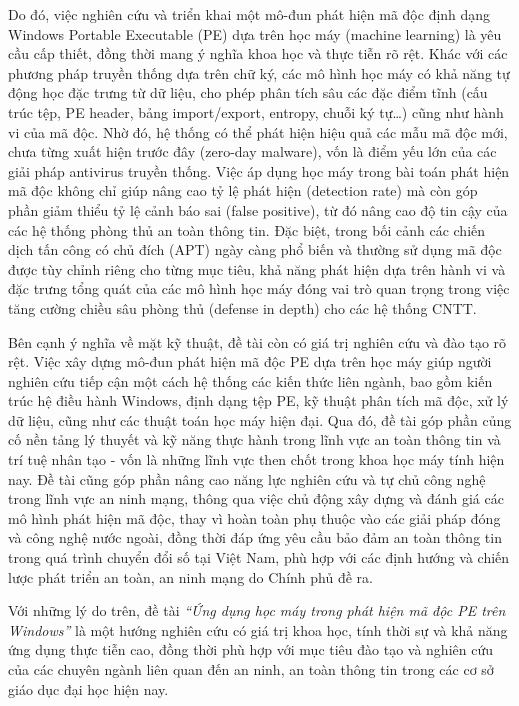 Do đó, việc nghiên cứu và triển khai một mô-đun phát hiện mã độc định dạng
Windows Portable Executable (PE) dựa trên học máy (machine learning) là yêu
cầu cấp thiết, đồng thời mang ý nghĩa khoa học và thực tiễn rõ rệt. Khác với
các phương pháp truyền thống dựa trên chữ ký, các mô hình học máy có khả năng
tự động học đặc trưng từ dữ liệu, cho phép phân tích sâu các đặc điểm tĩnh
(cấu trúc tệp, PE header, bảng import/export, entropy, chuỗi ký tự\ldots) cũng
như hành vi của mã độc. Nhờ đó, hệ thống có thể phát hiện hiệu quả các mẫu
mã độc mới, chưa từng xuất hiện trước đây (zero-day malware), vốn là điểm yếu
lớn của các giải pháp antivirus truyền thống. Việc áp dụng học máy trong bài
toán phát hiện mã độc không chỉ giúp nâng cao tỷ lệ phát hiện (detection rate)
mà còn góp phần giảm thiểu tỷ lệ cảnh báo sai (false positive), từ đó nâng
cao độ tin cậy của các hệ thống phòng thủ an toàn thông tin. Đặc biệt, trong
bối cảnh các chiến dịch tấn công có chủ đích (APT) ngày càng phổ biến và thường
sử dụng mã độc được tùy chỉnh riêng cho từng mục tiêu, khả năng phát hiện dựa
trên hành vi và đặc trưng tổng quát của các mô hình học máy đóng vai trò quan
trọng trong việc tăng cường chiều sâu phòng thủ (defense in depth) cho các hệ
thống CNTT.

Bên cạnh ý nghĩa về mặt kỹ thuật, đề tài còn có giá trị nghiên cứu và đào
tạo rõ rệt. Việc xây dựng mô-đun phát hiện mã độc PE dựa trên học máy giúp
người nghiên cứu tiếp cận một cách hệ thống các kiến thức liên ngành, bao gồm
kiến trúc hệ điều hành Windows, định dạng tệp PE, kỹ thuật phân tích mã độc,
xử lý dữ liệu, cũng như các thuật toán học máy hiện đại. Qua đó, đề tài góp
phần củng cố nền tảng lý thuyết và kỹ năng thực hành trong lĩnh vực an toàn
thông tin và trí tuệ nhân tạo - vốn là những lĩnh vực then chốt trong khoa
học máy tính hiện nay. Đề tài cũng góp phần nâng cao năng lực nghiên cứu và
tự chủ công nghệ trong lĩnh vực an ninh mạng, thông qua việc chủ động xây dựng
và đánh giá các mô hình phát hiện mã độc, thay vì hoàn toàn phụ thuộc vào các
giải pháp đóng và công nghệ nước ngoài, đồng thời đáp ứng yêu cầu bảo đảm an
toàn thông tin trong quá trình chuyển đổi số tại Việt Nam, phù hợp với các
định hướng và chiến lược phát triển an toàn, an ninh mạng do Chính phủ đề ra.
\cite{lsvn2026}

Với những lý do trên, đề tài \textit{``Ứng dụng học máy trong phát hiện mã độc
PE trên Windows''} là một hướng nghiên cứu có giá trị khoa học, tính thời sự
và khả năng ứng dụng thực tiễn cao, đồng thời phù hợp với mục tiêu đào tạo và
nghiên cứu của các chuyên ngành liên quan đến an ninh, an toàn thông tin trong
các cơ sở giáo dục đại học hiện nay.

















